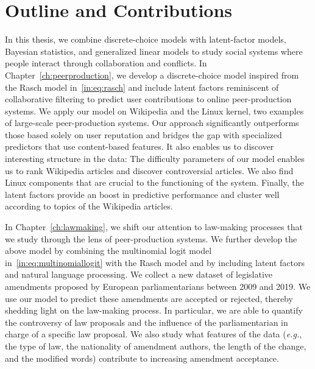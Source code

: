 \section{Outline and Contributions}
\label{in:sec:outline}

In this thesis, we combine discrete-choice models with latent-factor models, Bayesian statistics, and generalized linear models to study social systems where people interact through collaboration and conflicts.
In Chapter~\ref{ch:peerproduction}, we develop a discrete-choice model inspired from the Rasch model in~\eqref{in:eq:rasch} and include latent factors reminiscent of collaborative filtering to predict user contributions to online peer-production systems.
We apply our model on Wikipedia and the Linux kernel, two examples of large-scale peer-production systems.
Our approach significantly outperforms those based solely on user reputation and bridges the gap with specialized predictors that use content-based features.
It also enables us to discover interesting structure in the data:
The difficulty parameters of our model enables us to rank Wikipedia articles and discover controversial articles.
We also find Linux components that are crucial to the functioning of the system.
Finally, the latent factors provide an boost in predictive performance and cluster well according to topics of the Wikipedia articles.

In Chapter~\ref{ch:lawmaking}, we shift our attention to law-making processes that we study through the lens of peer-production systems.
We further develop the above model by combining the multinomial logit model in~\eqref{in:eq:multinomiallogit} with the Rasch model and by including latent factors and natural language processing.
We collect a new dataset of  legislative amendments proposed by European parliamentarians between 2009 and 2019.
We use our model to predict these amendments are accepted or rejected, thereby shedding light on the law-making process.
In particular, we are able to quantify the controversy of law proposals and the influence of the parliamentarian in charge of a specific law proposal.
We also study what features of the data (\textit{e.g.}, the type of law, the nationality of amendment authors, the length of the change, and the modified words) contribute to increasing amendment acceptance.

